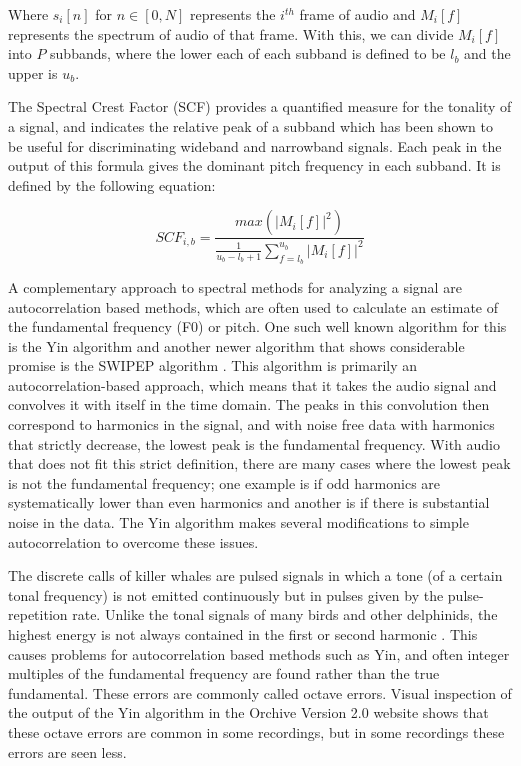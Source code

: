 \noindent Where $s_i[n]$ for $n \in [0,N]$ represents the $i^{th}$ frame of
audio and $M_i[f]$ represents the spectrum of audio of that frame.
With this, we can divide $M_i[f]$ into $P$ subbands, where the lower
each of each subband is defined to be $l_b$ and the upper is $u_b$.

The Spectral Crest Factor (SCF) provides a quantified measure for the
tonality of a signal, and indicates the relative peak of a subband
which has been shown to be useful \cite{hosseinzadeh2007mfcc} for
discriminating wideband and narrowband signals.  Each peak in the
output of this formula gives the dominant pitch frequency in each
subband.  It is defined by the following equation:

\begin{equation} 
SCF_{i,b} = \frac{max(|M_i[f]|^2)}
	                {\frac{1}{u_b - l_b + 1}\sum_{f=l_b}^{u_b} |M_i [f]|^2} 
\end{equation}

A complementary approach to spectral methods for analyzing a signal
are autocorrelation based methods, which are often used to calculate
an estimate of the fundamental frequency (F0) or pitch.  One such well
known algorithm for this is the Yin algorithm \cite{cheveigne2002yin}
and another newer algorithm that shows considerable promise is the
SWIPEP algorithm \cite{camachophd}.  This algorithm is primarily an
autocorrelation-based approach, which means that it takes the audio
signal and convolves it with itself in the time domain.  The peaks in
this convolution then correspond to harmonics in the signal, and with
noise free data with harmonics that strictly decrease, the lowest peak
is the fundamental frequency.  With audio that does not fit this
strict definition, there are many cases where the lowest peak is not
the fundamental frequency; one example is if odd harmonics are
systematically lower than even harmonics and another is if there is
substantial noise in the data.  The Yin algorithm makes several
modifications to simple autocorrelation to overcome these issues.

The discrete calls of killer whales are pulsed signals in which a tone
(of a certain tonal frequency) is not emitted continuously but in
pulses given by the pulse-repetition rate. Unlike the tonal signals of
many birds and other delphinids, the highest energy is not always
contained in the first or second harmonic
\cite{deecke1999quantifying}.  This causes problems for
autocorrelation based methods such as Yin, and often integer multiples
of the fundamental frequency are found rather than the true
fundamental.  These errors are commonly called octave errors.  Visual
inspection of the output of the Yin algorithm in the Orchive Version
2.0 website shows that these octave errors are common in some
recordings, but in some recordings these errors are seen less.

